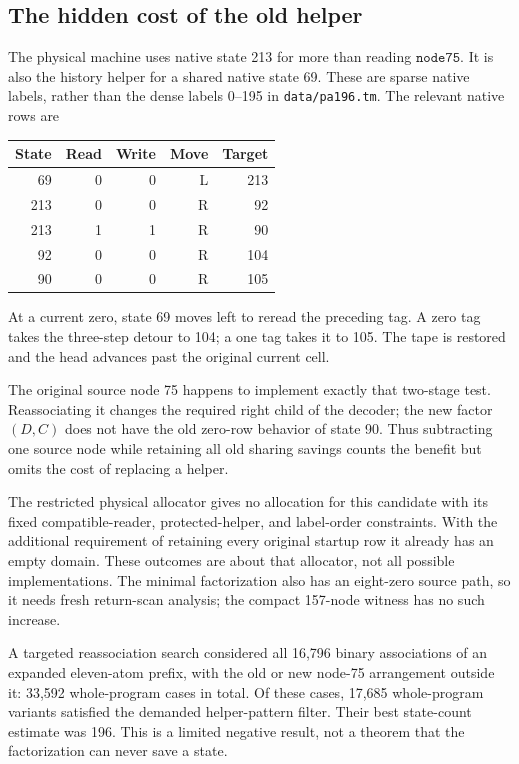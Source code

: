 \documentclass[11pt,letterpaper]{article}
\newcommand{\file}[1]{\texttt{\nolinkurl{#1}}}
\begin{document}
\subsection{The hidden cost of the old helper}

The physical machine uses native state 213 for more than reading
$\mathtt{node75}$. It is also the history helper for a shared native state
69. These are sparse native labels, rather than the dense labels
0--195 in \file{data/pa196.tm}. The relevant native rows are
\begin{center}
\begin{tabular}{@{}rrrrr@{}}
\toprule
State&Read&Write&Move&Target\\
\midrule
69&0&0&L&213\\
213&0&0&R&92\\
213&1&1&R&90\\
92&0&0&R&104\\
90&0&0&R&105\\
\bottomrule
\end{tabular}
\end{center}
At a current zero, state 69 moves left to reread the preceding tag. A zero
tag takes the three-step detour to 104; a one tag takes it to 105. The tape
is restored and the head advances past the original current cell.

The original source node 75 happens to implement exactly that two-stage
test. Reassociating it changes the required right child of the decoder;
the new factor $(D,C)$ does not have the old zero-row behavior of state 90.
Thus subtracting one source node while retaining all old sharing savings
counts the benefit but omits the cost of replacing a helper.

The restricted physical allocator gives no allocation for this candidate
with its fixed compatible-reader, protected-helper, and label-order
constraints. With
the additional requirement of retaining every original startup row it
already has an empty domain. These outcomes are about that allocator,
not all possible implementations. The minimal factorization also has an
eight-zero source path, so it needs fresh return-scan analysis; the compact
157-node witness has no such increase.

A targeted reassociation search considered all 16,796
binary associations of an expanded eleven-atom prefix, with the old or new
node-75 arrangement outside it: 33,592 whole-program cases in total.
Of these cases, 17,685 whole-program
variants satisfied the demanded helper-pattern filter. Their best
state-count estimate was 196. This is a limited negative result, not a
theorem that the factorization can never save a state.
\end{document}
